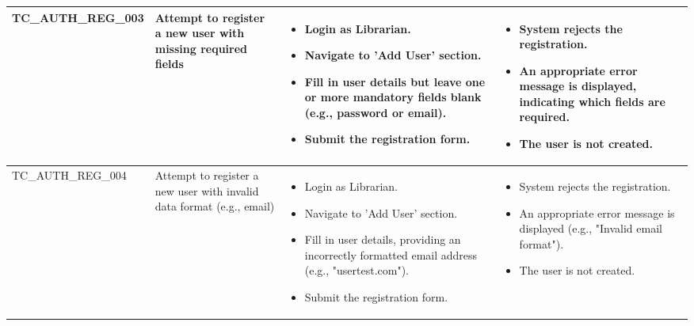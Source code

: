 \begin{longtable}{|>{\scriptsize\raggedright\arraybackslash}p{3.5cm}|>{\raggedright\arraybackslash}p{3.5cm}|>{\raggedright\arraybackslash}p{4cm}|>{\raggedright\arraybackslash}p{4cm}|}
TC\_AUTH\_REG\_003 & Attempt to register a new user with missing required fields & 
    \begin{itemize}[noitemsep, topsep=0pt, partopsep=0pt, leftmargin=*]
        \item Login as Librarian.
        \item Navigate to 'Add User' section.
        \item Fill in user details but leave one or more mandatory fields blank (e.g., password or email). 
        \item Submit the registration form.
    \end{itemize} & 
    \begin{itemize}[noitemsep, topsep=0pt, partopsep=0pt, leftmargin=*]
        \item System rejects the registration.
        \item An appropriate error message is displayed, indicating which fields are required.
        \item The user is not created.
    \end{itemize} \\ \hline
TC\_AUTH\_REG\_004 & Attempt to register a new user with invalid data format (e.g., email) & 
    \begin{itemize}[noitemsep, topsep=0pt, partopsep=0pt, leftmargin=*]
        \item Login as Librarian.
        \item Navigate to 'Add User' section.
        \item Fill in user details, providing an incorrectly formatted email address (e.g., "usertest.com"). 
        \item Submit the registration form.
    \end{itemize} & 
    \begin{itemize}[noitemsep, topsep=0pt, partopsep=0pt, leftmargin=*]
        \item System rejects the registration.
        \item An appropriate error message is displayed (e.g., "Invalid email format").
        \item The user is not created.
    \end{itemize} \\ \hline


\end{longtable}
